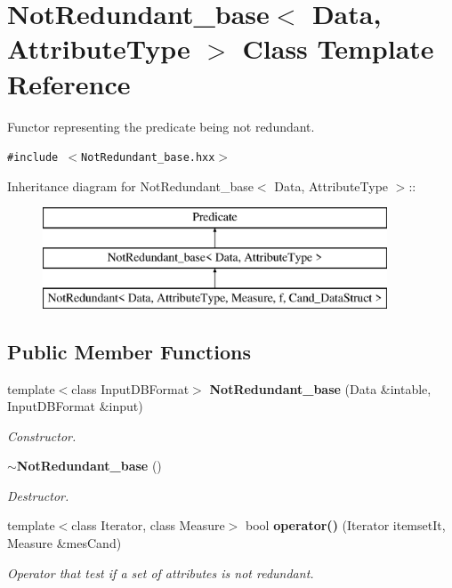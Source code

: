 \section{Not\-Redundant\_\-base$<$ Data, Attribute\-Type $>$ Class Template Reference}
\label{class_not_redundant__base}
Functor representing the predicate being not redundant.  


{\tt \#include $<$Not\-Redundant\_\-base.hxx$>$}

Inheritance diagram for Not\-Redundant\_\-base$<$ Data, Attribute\-Type $>$::\begin{figure}[H]
\begin{center}
\leavevmode
\includegraphics[height=3cm]{class_not_redundant__base}
\end{center}
\end{figure}
\subsection*{Public Member Functions}
\begin{CompactItemize}
\item 
template$<$class Input\-DBFormat$>$ {\bf Not\-Redundant\_\-base} (Data \&intable, Input\-DBFormat \&input)\label{class_not_redundant__base_4092a325b462c642b99353b33d35030b}

\begin{CompactList}\small\item\em Constructor. \item\end{CompactList}\item 
{\bf $\sim$Not\-Redundant\_\-base} ()\label{class_not_redundant__base_508fc4c9e91210a2998dfcd951c15952}

\begin{CompactList}\small\item\em Destructor. \item\end{CompactList}\item 
template$<$class Iterator, class Measure$>$ bool {\bf operator()} (Iterator itemset\-It, Measure \&mes\-Cand)
\begin{CompactList}\small\item\em Operator that test if a set of attributes is not redundant. \item\end{CompactList}\end{CompactItemize}

